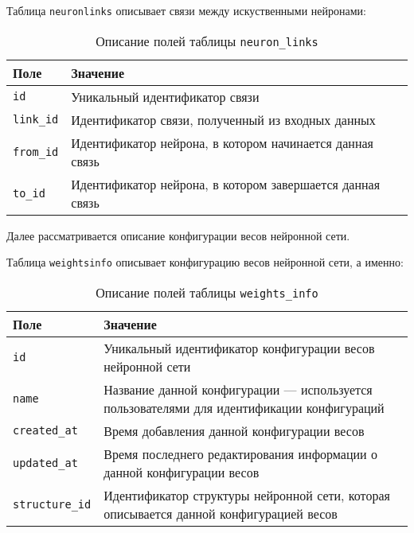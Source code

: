 Таблица \texttt{neuronlinks} описывает связи между искуственными нейронами:

\begin{table}[!ht]
    \caption{Описание полей таблицы \texttt{neuron\_links}}
    \label{tbl:neuronlinks}
    \begin{center}
        \begin{tabular}{|p{}|p{}|}
            \hline
            \textbf{Поле} & \textbf{Значение} \\\hline
            \texttt{id} & Уникальный идентификатор связи \\\hline
            \texttt{link\_id} & Идентификатор связи, полученный из входных данных \\\hline
            \texttt{from\_id} & Идентификатор нейрона, в котором начинается данная связь \\\hline
            \texttt{to\_id} & Идентификатор нейрона, в котором завершается данная связь \\\hline
        \end{tabular}
    \end{center}
\end{table}

Далее рассматривается описание конфигурации весов нейронной сети.

Таблица \texttt{weightsinfo} описывает конфигурацию весов нейронной сети, а именно:

\begin{table}[!ht]
    \caption{Описание полей таблицы \texttt{weights\_info}}
    \label{tbl:weightsinfo}
    \begin{center}
        \begin{tabular}{|p{}|p{}|}
            \hline
            \textbf{Поле} & \textbf{Значение} \\\hline
            \texttt{id} & Уникальный идентификатор конфигурации весов нейронной сети \\\hline
            \texttt{name} & Название данной конфигурации --- используется пользователями для идентификации конфигураций \\\hline
            \texttt{created\_at} & Время добавления  данной конфигурации весов\\\hline
            \texttt{updated\_at} & Время последнего редактирования информации о данной конфигурации весов \\\hline
            \texttt{structure\_id} & Идентификатор структуры нейронной сети, которая описывается данной конфигурацией весов\\\hline
        \end{tabular}
    \end{center}
\end{table}

